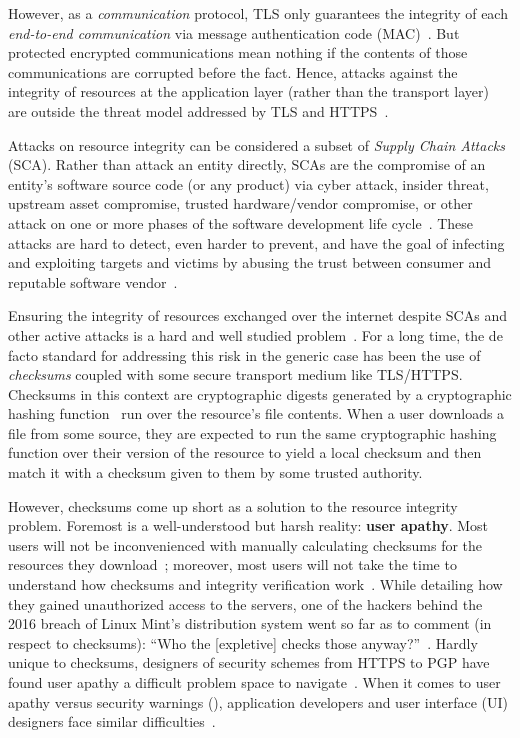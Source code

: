 However, as a \textit{communication} protocol, TLS only guarantees the integrity
of each \textit{end-to-end communication} via message authentication code
(MAC)~\cite{TLS1.2}. But protected encrypted communications mean nothing if the
contents of those communications are corrupted before the fact. Hence, attacks
against the integrity of resources at the application layer (rather than the
transport layer) are outside the threat model addressed by TLS and
HTTPS~\cite{TLS1.2, HTTPS}.

Attacks on resource integrity can be considered a subset of \emph{Supply Chain
Attacks} (SCA). Rather than attack an entity directly, SCAs are the compromise
of an entity's software source code (or any product) via cyber attack, insider
threat, upstream asset compromise, trusted hardware/vendor compromise, or other
attack on one or more phases of the software development life
cycle~\cite{NIST-SCA}. These attacks are hard to detect, even harder to prevent,
and have the goal of infecting and exploiting targets and victims by abusing the
trust between consumer and reputable software vendor~\cite{SCA}.

Ensuring the integrity of resources exchanged over the internet despite SCAs and
other active attacks is a hard and well studied problem~\cite{MD5Header,
HTTP1.1, HTTPS, SRI, LF, OpenPGP1, DNSSEC, PKI, Cherubini, Stickler}. For a long
time, the de facto standard for addressing this risk in the generic case has
been the use of \textit{checksums} coupled with some secure transport medium
like TLS/HTTPS. Checksums in this context are cryptographic digests generated by
a cryptographic hashing function~\cite{Rogaway} run over the resource's file
contents. When a user downloads a file from some source, they are expected to
run the same cryptographic hashing function over their version of the resource
to yield a local checksum and then match it with a checksum given to them by
some trusted authority.

However, checksums come up short as a solution to the resource integrity
problem. Foremost is a well-understood but harsh reality: \textbf{user apathy}.
Most users will not be inconvenienced with manually calculating checksums for
the resources they download~\cite{Cherubini, Fagan}; moreover, most users will
not take the time to understand how checksums and integrity verification
work~\cite{Cherubini, Tan, Hsiao}. While detailing how they gained unauthorized
access to the servers, one of the hackers behind the 2016 breach of Linux Mint's
distribution system went so far as to comment (in respect to checksums): ``Who
the [expletive] checks those anyway?''~\cite{SCA-MINT3}. Hardly unique to
checksums, designers of security schemes from HTTPS to PGP have found user
apathy a difficult problem space to navigate~\cite{PGPBad, Cherubini}. When it
comes to user apathy versus security warnings (),
application developers and user interface (UI) designers face similar
difficulties~\cite{Egelman1, Egelman2, Modic, Reeder, Silic, Sunshine, Bianchi,
Akhawe}.

